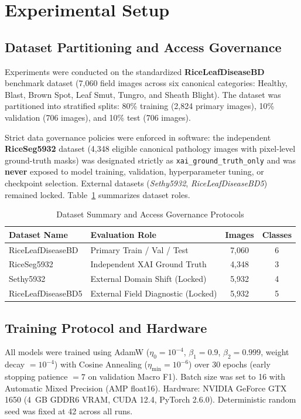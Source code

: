 \documentclass[conference]{IEEEtran}
\begin{document}
\section{Experimental Setup}
\label{sec:experimental_setup}

\subsection{Dataset Partitioning and Access Governance}
Experiments were conducted on the standardized \textbf{RiceLeafDiseaseBD} benchmark dataset (7,060 field images across six canonical categories: Healthy, Blast, Brown Spot, Leaf Smut, Tungro, and Sheath Blight). The dataset was partitioned into stratified splits: 80\% training (2,824 primary images), 10\% validation (706 images), and 10\% test (706 images). 

Strict data governance policies were enforced in software: the independent \textbf{RiceSeg5932} dataset (4,348 eligible canonical pathology images with pixel-level ground-truth masks) was designated strictly as \texttt{xai\_ground\_truth\_only} and was \textbf{never} exposed to model training, validation, hyperparameter tuning, or checkpoint selection. External datasets (\textit{Sethy5932}, \textit{RiceLeafDiseaseBD5}) remained locked. Table~\ref{tab:dataset_summary} summarizes dataset roles.

\begin{table}[htbp]
\centering
\caption{Dataset Summary and Access Governance Protocols}
\label{tab:dataset_summary}
\footnotesize
\setlength{\tabcolsep}{4.5pt}
\begin{tabular}{llcc}
\toprule
\textbf{Dataset Name} & \textbf{Evaluation Role} & \textbf{Images} & \textbf{Classes} \\
\midrule
RiceLeafDiseaseBD & Primary Train / Val / Test & 7,060 & 6 \\
RiceSeg5932 & Independent XAI Ground Truth & 4,348 & 3 \\
Sethy5932 & External Domain Shift (Locked) & 5,932 & 4 \\
RiceLeafDiseaseBD5 & External Field Diagnostic (Locked) & 5,932 & 5 \\
\bottomrule
\end{tabular}
\end{table}

\subsection{Training Protocol and Hardware}
All models were trained using AdamW ($\eta_0 = 10^{-4}$, $\beta_1 = 0.9$, $\beta_2 = 0.999$, weight decay $= 10^{-4}$) with Cosine Annealing ($\eta_{\text{min}} = 10^{-6}$) over 30 epochs (early stopping patience $= 7$ on validation Macro F1). Batch size was set to 16 with Automatic Mixed Precision (AMP float16). Hardware: NVIDIA GeForce GTX 1650 (4~GB GDDR6 VRAM, CUDA 12.4, PyTorch 2.6.0). Deterministic random seed was fixed at 42 across all runs.
\end{document}
